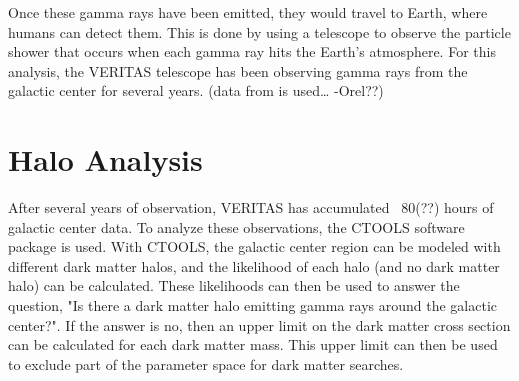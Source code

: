 Once these gamma rays have been emitted, they would travel to Earth, where humans can detect them.
This is done by using a telescope to observe the particle shower that occurs when each gamma ray hits the Earth's atmosphere.
For this analysis, the VERITAS telescope has been observing gamma rays from the galactic center for several years.
(data from is used… -Orel??)


\section{Halo Analysis}
After several years of observation, VERITAS has accumulated ~80(??) hours of galactic center data.
To analyze these observations, the CTOOLS software package \cite{gammalibctools} is used.
With CTOOLS, the galactic center region can be modeled with different dark matter halos, and the likelihood of each halo (and no dark matter halo) can be calculated.
These likelihoods can then be used to answer the question, "Is there a dark matter halo emitting gamma rays around the galactic center?".
If the answer is no, then an upper limit on the dark matter cross section can be calculated for each dark matter mass.
This upper limit can then be used to exclude part of the parameter space for dark matter searches.


